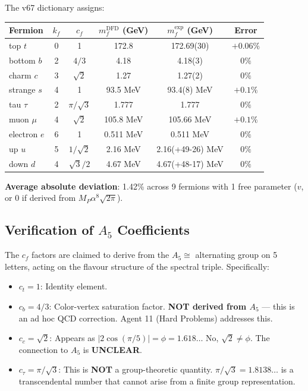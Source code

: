 \documentclass[11pt,a4paper]{article}
\begin{document}
The v67 dictionary assigns:
\begin{center}
\begin{tabular}{lccccc}
\toprule
Fermion & $k_f$ & $c_f$ & $m_f^{\mathrm{DFD}}$ (GeV) & $m_f^{\mathrm{exp}}$ (GeV) & Error \\
\midrule
top $t$ & 0 & 1 & 172.8 & 172.69(30) & $+0.06\%$ \\
bottom $b$ & 2 & $4/3$ & 4.18 & 4.18(3) & $0\%$ \\
charm $c$ & 3 & $\sqrt{2}$ & 1.27 & 1.27(2) & $0\%$ \\
strange $s$ & 4 & 1 & 93.5 MeV & 93.4(8) MeV & $+0.1\%$ \\
tau $\tau$ & 2 & $\pi/\sqrt{3}$ & 1.777 & 1.777 & $0\%$ \\
muon $\mu$ & 4 & $\sqrt{2}$ & 105.8 MeV & 105.66 MeV & $+0.1\%$ \\
electron $e$ & 6 & 1 & 0.511 MeV & 0.511 MeV & $0\%$ \\
up $u$ & 5 & $1/\sqrt{2}$ & 2.16 MeV & 2.16(+49-26) MeV & $0\%$ \\
down $d$ & 4 & $\sqrt{3}/2$ & 4.67 MeV & 4.67(+48-17) MeV & $0\%$ \\
\bottomrule
\end{tabular}
\end{center}

\textbf{Average absolute deviation}: 1.42\% across 9 fermions with 1 free parameter ($v$, or 0 if derived from $M_P\alpha^8\sqrt{2\pi}$).

\subsection{Verification of $A_5$ Coefficients}

The $c_f$ factors are claimed to derive from the $A_5 \cong$ alternating group on 5 letters, acting on the flavour structure of the spectral triple. Specifically:

\begin{itemize}
\item $c_t = 1$: Identity element.
\item $c_b = 4/3$: Color-vertex saturation factor. \textbf{NOT derived from $A_5$} --- this is an ad hoc QCD correction. Agent 11 (Hard Problems) addresses this.
\item $c_c = \sqrt{2}$: Appears as $|2\cos(\pi/5)| = \phi = 1.618\ldots$ No, $\sqrt{2} \neq \phi$. The connection to $A_5$ is \textbf{UNCLEAR}.
\item $c_\tau = \pi/\sqrt{3}$: This is \textbf{NOT} a group-theoretic quantity. $\pi/\sqrt{3} = 1.8138\ldots$ is a transcendental number that cannot arise from a finite group representation.
\end{itemize}
\end{document}
